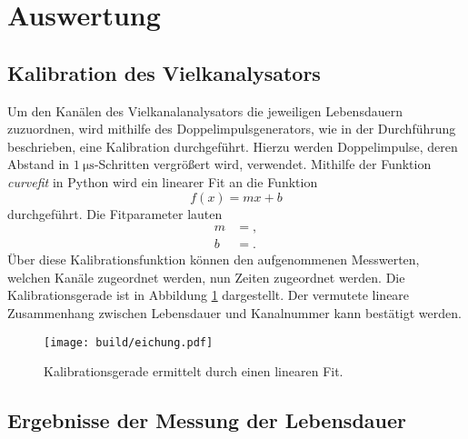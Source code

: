 \section{Auswertung}
\label{sec:Auswertung}

\subsection{Kalibration des Vielkanalysators}

Um den Kanälen des Vielkanalanalysators die jeweiligen Lebensdauern zuzuordnen, wird mithilfe des Doppelimpulsgenerators, wie in der Durchführung beschrieben, eine Kalibration durchgeführt.
Hierzu werden Doppelimpulse, deren Abstand in $\SI{1}{\micro\second}$-Schritten vergrößert wird, verwendet.
Mithilfe der Funktion \emph{curvefit} in Python \cite{scipy} wird ein linearer Fit an die Funktion
\begin{equation}
  f(x) = mx + b \label{linfit}
\end{equation}
durchgeführt.
Die Fitparameter lauten
\begin{align*}
  m &= ,\\
  b &= .
\end{align*}
Über diese Kalibrationsfunktion können den aufgenommenen Messwerten, welchen Kanäle zugeordnet werden, nun Zeiten zugeordnet werden.
Die Kalibrationsgerade ist in Abbildung \ref{plot:kali} dargestellt.
Der vermutete lineare Zusammenhang zwischen Lebensdauer und Kanalnummer kann bestätigt werden.

\begin{figure}
  \centering
  \texttt{[image: build/eichung.pdf]}
  \caption{Kalibrationsgerade ermittelt durch einen linearen Fit.}
  \label{plot:kali}
\end{figure}

\subsection{Ergebnisse der Messung der Lebensdauer}


